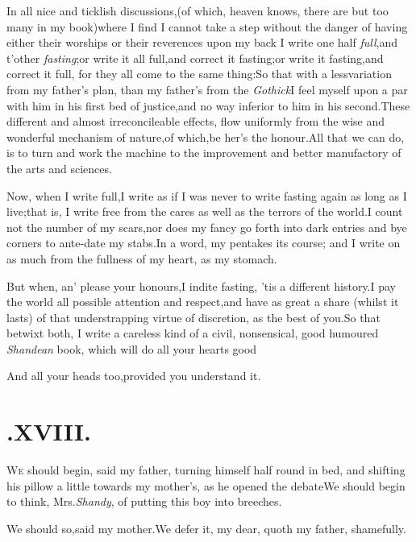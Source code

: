 \documentclass{article}
\begin{document}
In all nice and ticklish discussions,\tsk (of which, heaven
knows, there are but too many in my book)\tsk where I find I
cannot take a step without the danger of having either their
worships or their reverences upon my back\tsh\break
I write one half \textit{full},\tsk and t’other
\textit{fasting};\tsh or write it all full,\tsk and
correct it fasting;\tsh or write it fasting,\tsk and
correct it full, for they all come to the same
thing:\tsh So that with a less\pb variation from my
father’s plan, than my father’s from the
\textit{Gothick}\tsk I feel myself upon a par with him in his first
bed of justice,\tsk and no way inferior to him in his
second.\tsh These different and almost irreconcileable
effects, flow uniformly from the wise and wonderful mechanism of
nature,\tsk of which,\tsk be her’s the
honour.\tsh All that we can do, is to turn and work the
machine to the improvement and better manufactory of the arts and
sciences.\tsh

Now, when I write full,\tsk I write as if I was never to write
fasting again as long as I live;\tsh that is, I write free
from the cares as well as the terrors of the
world.\tsh I count not the number of my scars,\tsk nor
does my fancy go forth into dark entries and bye corners to
ante-date my stabs.\tsh In a word, my pen\pb takes its
course; and I write on as much from the fullness of my heart, as my\break
stomach.\tsh

But when, an’ please your honours,\break I indite fasting, ’tis
a different history.\break\tsh I pay the world all possible
attention and respect,\tsk and have as great a share (whilst it
lasts) of that understrap\-ping virtue of discretion, as the best
of you.\tsh So that betwixt both, I write a careless kind of a
civil, nonsensical, good humoured \textit{Shandean} book, which
will do all your hearts good\tsh

\tsh And all your heads too,\tsk provided you
understand it.

\newpage
\section{.\enspace XVIII.}

\lettrine{W}{e} should begin, said my father,
turning himself half round in bed, and shifting his pillow a little
towards my mother’s, as he opened the debate\tsh We
should begin to think, Mrs.\@ \textit{Shandy}, of putting this boy into
breeches.\tsh

We should so,\tsk said my mother.\tsh We defer it, my
dear, quoth my father, shamefully.\tsh
\end{document}
